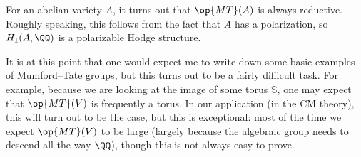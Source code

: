 \documentclass{article}
\begin{document}
\begin{remark}
	For an abelian variety $A$, it turns out that $\op{MT}(A)$ is always reductive. Roughly speaking, this follows from the fact that $A$ has a polarization, so $H_1(A,\QQ)$ is a polarizable Hodge structure.
\end{remark}
It is at this point that one would expect me to write down some basic examples of Mumford--Tate groups, but this turns out to be a fairly difficult task. For example, because we are looking at the image of some torus $\mathbb S$, one may expect that $\op{MT}(V)$ is frequently a torus. In our application (in the CM theory), this will turn out to be the case, but this is exceptional: most of the time we expect $\op{MT}(V)$ to be large (largely because the algebraic group needs to descend all the way $\QQ$), though this is not always easy to prove.
\end{document}
